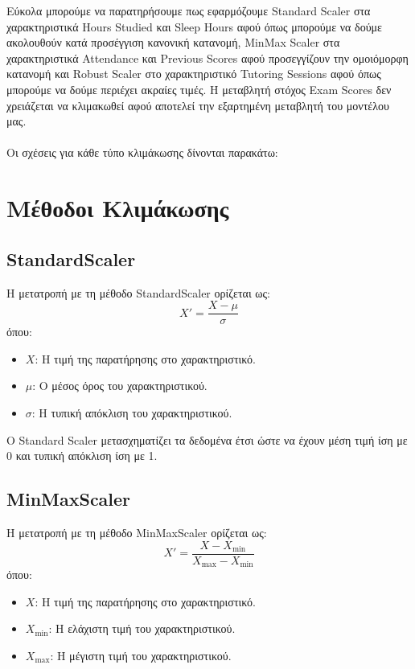 \documentclass[12pt]{article}
\begin{document}
Εύκολα μπορούμε να παρατηρήσουμε πως εφαρμόζουμε Standard Scaler στα χαρακτηριστικά Hours Studied και Sleep Hours αφού όπως μπορούμε να δούμε ακολουθούν κατά προσέγγιση κανονική κατανομή, MinMax Scaler στα χαρακτηριστικά Attendance και Previous Scores αφού προσεγγίζουν την ομοιόμορφη κατανομή και Robust Scaler στο χαρακτηριστικό Tutoring Sessions αφού όπως μπορούμε να δούμε περιέχει ακραίες τιμές. Η μεταβλητή στόχος Exam Scores δεν χρειάζεται να κλιμακωθεί αφού αποτελεί την εξαρτημένη μεταβλητή του μοντέλου μας.\\
\\
\noindent Οι σχέσεις για κάθε τύπο κλιμάκωσης δίνονται παρακάτω: 

\section*{Μέθοδοι Κλιμάκωσης}

\subsection*{StandardScaler}
Η μετατροπή με τη μέθοδο StandardScaler ορίζεται ως:
\[
X' = \frac{X - \mu}{\sigma}
\]
όπου:
\begin{itemize}
    \item \( X \): Η τιμή της παρατήρησης στο χαρακτηριστικό.
    \item \( \mu \): Ο μέσος όρος του χαρακτηριστικού.
    \item \( \sigma \): Η τυπική απόκλιση του χαρακτηριστικού.
\end{itemize}

\noindent Ο Standard Scaler μετασχηματίζει τα δεδομένα έτσι ώστε να έχουν μέση τιμή ίση με 0 και τυπική απόκλιση ίση με 1.

\subsection*{MinMaxScaler}
Η μετατροπή με τη μέθοδο MinMaxScaler ορίζεται ως:
\[
X' = \frac{X - X_{\text{min}}}{X_{\text{max}} - X_{\text{min}}}
\]
όπου:
\begin{itemize}
    \item \( X \): Η τιμή της παρατήρησης στο χαρακτηριστικό.
    \item \( X_{\text{min}} \): Η ελάχιστη τιμή του χαρακτηριστικού.
    \item \( X_{\text{max}} \): Η μέγιστη τιμή του χαρακτηριστικού.
\end{itemize}
\end{document}
